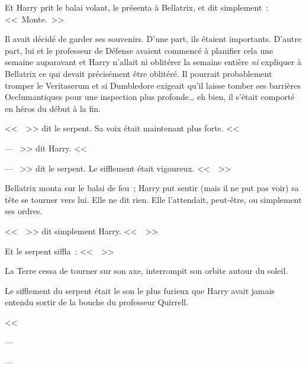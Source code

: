 Et Harry prit le balai volant, le présenta à Bellatrix, et dit simplement~: <<~Monte.~>>

Il avait décidé de garder ses souvenirs. D'une part, ils étaient importants. D'autre part, lui et le professeur de Défense avaient commencé à planifier cela une semaine auparavant et Harry n'allait ni oblitérer la semaine entière \emph{ni} expliquer à Bellatrix ce qui devait précisément être oblitéré. Il pourrait probablement tromper le Veritaserum et si Dumbledore exigeait qu'il laisse tomber ses barrières Occlumantiques pour une inspection plus profonde… eh bien, il s'était comporté en héros du début à la fin.

<<~~>> dit le serpent. Sa voix était maintenant plus forte. <<~

--- ~>> dit Harry. <<~

--- ~>> dit le serpent. Le sifflement était vigoureux. <<~~>>

Bellatrix monta sur le balai de feu~; Harry put sentir (mais il ne put pas voir) sa tête se tourner vers lui. Elle ne dit rien. Elle l'attendait, peut-être, ou simplement ses ordres.

<<~~>> dit simplement Harry. <<~~>>

Et le serpent siffla~: <<~~>>

La Terre cessa de tourner sur son axe, interrompit son orbite autour du soleil.

Le sifflement du serpent était le son le plus furieux que Harry avait jamais entendu sortir de la bouche du professeur Quirrell.

<<~

--- 

--- 

